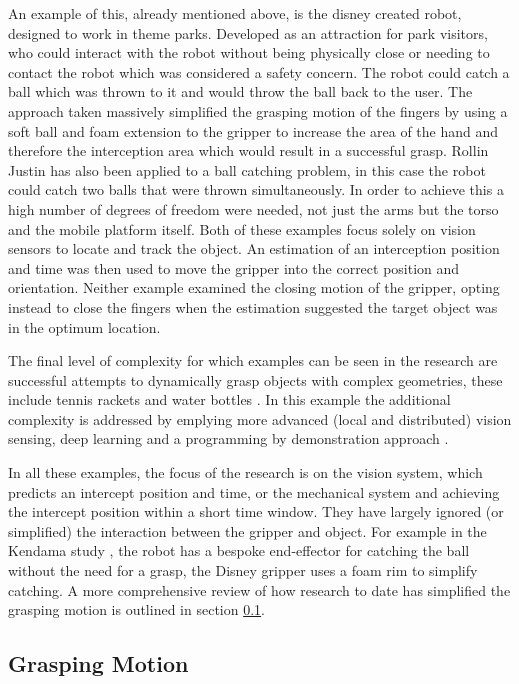 An example of this, already mentioned above, is the disney created robot, designed to work in theme parks. Developed as an attraction for park visitors, who could interact with the robot without being physically close or needing to contact the robot which was considered a safety concern. The robot could catch a ball which was thrown to it and would throw the ball back to the user. The approach taken massively simplified the grasping motion of the fingers by using a soft ball and foam extension to the gripper to increase the area of the hand and therefore the interception area which would result in a successful grasp. Rollin Justin has also been applied to a ball catching problem, in this case the robot could catch two balls that were thrown simultaneously. In order to achieve this a high number of degrees of freedom were needed, not just the arms but the torso and the mobile platform itself. Both of these examples focus solely on vision sensors to locate and track the object. An estimation of an interception position and time was then used to move the gripper into the correct position and orientation. Neither example examined the closing motion of the gripper, opting instead to close the fingers when the estimation suggested the target object was in the optimum location. 

The final level of complexity for which examples can be seen in the research are successful attempts to dynamically grasp objects with complex geometries, these include tennis rackets and water bottles \cite{TennisRacket}. In this example the additional complexity is addressed by emplying more advanced (local and distributed) vision sensing, deep learning and a programming by demonstration approach \cite{TennisRacket}.

In all these examples, the focus of the research is on the vision system, which predicts an intercept position and time, or the mechanical system and achieving the intercept position within a short time window. They have largely ignored (or simplified) the interaction between the gripper and object. For example in the Kendama study \cite{Kendama}, the robot has a bespoke end-effector for catching the ball without the need for a grasp, the Disney gripper \cite{DisneyRobot} uses a foam rim to simplify catching. A more comprehensive review of how research to date has simplified the grasping motion is outlined in section \ref{GraspingMotion}.

\subsection{Grasping Motion}\label{GraspingMotion}


